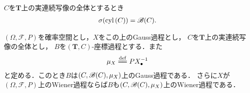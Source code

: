 	\begin{screen}
		\begin{thm}[連続写像の全体の筒集合族はBorel集合族を生成する]
			$C$を$\mathbf{T}$上の実連続写像の全体とするとき
			\begin{align}
				\sigma(\operatorname{cyl}\left(C\right)) = \mathscr{B}(C).
			\end{align}
		\end{thm}
	\end{screen}
	
	\begin{sketch}
	\end{sketch}
	
	\begin{screen}
		\begin{thm}\label{thm:Wiener_process_on_continuous_functions}
			$(\Omega,\mathscr{F},P)$を確率空間とし，$X$をこの上のGauss過程とし，
			$C$を$\mathbf{T}$上の実連続写像の全体とし，
			$B$を$(\mathbf{T},C)$-座標過程とする．また
			\begin{align}
				\mu_X \defeq P X_\bullet^{-1}
			\end{align}
			と定める．このとき$B$は$(C,\mathscr{B}(C),\mu_X)$上のGauss過程である．
			さらに$X$が$(\Omega,\mathscr{F},P)$上のWiener過程ならば$B$も$(C,\mathscr{B}(C),\mu_X)$上のWiener過程である．
		\end{thm}
	\end{screen}
	
